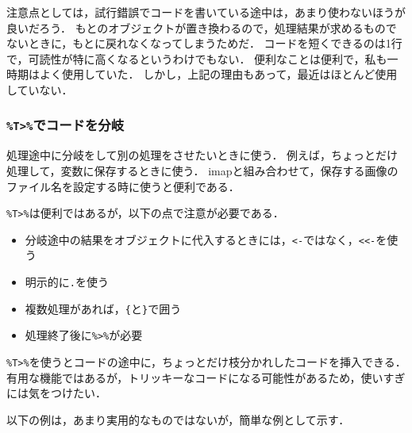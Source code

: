 \documentclass[
]{article}
\providecommand{\tightlist}{%
  \setlength{\itemsep}{0pt}\setlength{\parskip}{0pt}}
\begin{document}
注意点としては，試行錯誤でコードを書いている途中は，あまり使わないほうが良いだろう．
もとのオブジェクトが置き換わるので，処理結果が求めるものでないときに，もとに戻れなくなってしまうためだ．
コードを短くできるのは1行で，可読性が特に高くなるというわけでもない．
便利なことは便利で，私も一時期はよく使用していた．
しかし，上記の理由もあって，最近はほとんど使用していない．

\hypertarget{tux3067ux30b3ux30fcux30c9ux3092ux5206ux5c90}{%
\subsubsection{\texorpdfstring{\texttt{\%T\textgreater{}\%}でコードを分岐}{\%T\textgreater\%でコードを分岐}}\label{tux3067ux30b3ux30fcux30c9ux3092ux5206ux5c90}}

処理途中に分岐をして別の処理をさせたいときに使う．
例えば，ちょっとだけ処理して，変数に保存するときに使う．
imapと組み合わせて，保存する画像のファイル名を設定する時に使うと便利である．

\texttt{\%T\textgreater{}\%}は便利ではあるが，以下の点で注意が必要である．

\begin{itemize}
\tightlist
\item
  分岐途中の結果をオブジェクトに代入するときには，\texttt{\textless{}-}ではなく，\texttt{\textless{}\textless{}-}を使う\\
\item
  明示的に\texttt{.}を使う\\
\item
  複数処理があれば，\texttt{\{}と\texttt{\}}で囲う\\
\item
  処理終了後に\texttt{\%\textgreater{}\%}が必要
\end{itemize}

\texttt{\%T\textgreater{}\%}を使うとコードの途中に，ちょっとだけ枝分かれしたコードを挿入できる．
有用な機能ではあるが，トリッキーなコードになる可能性があるため，使いすぎには気をつけたい．

以下の例は，あまり実用的なものではないが，簡単な例として示す．
\end{document}
